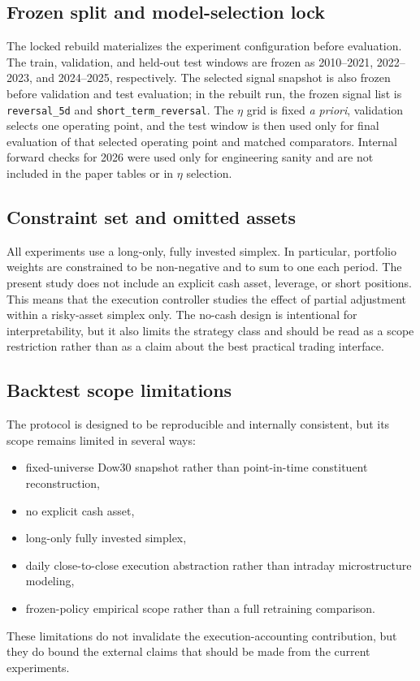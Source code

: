 \documentclass[10pt,twocolumn]{article}
\begin{document}
\subsection{Frozen split and model-selection lock}
The locked rebuild materializes the experiment configuration before evaluation. The train, validation, and held-out test windows are frozen as 2010--2021, 2022--2023, and 2024--2025, respectively. The selected signal snapshot is also frozen before validation and test evaluation; in the rebuilt run, the frozen signal list is \texttt{reversal\_5d} and \texttt{short\_term\_reversal}. The $\eta$ grid is fixed \emph{a priori}, validation selects one operating point, and the test window is then used only for final evaluation of that selected operating point and matched comparators. Internal forward checks for 2026 were used only for engineering sanity and are not included in the paper tables or in $\eta$ selection.

\subsection{Constraint set and omitted assets}
All experiments use a long-only, fully invested simplex. In particular, portfolio weights are constrained to be non-negative and to sum to one each period. The present study does not include an explicit cash asset, leverage, or short positions. This means that the execution controller studies the effect of partial adjustment within a risky-asset simplex only. The no-cash design is intentional for interpretability, but it also limits the strategy class and should be read as a scope restriction rather than as a claim about the best practical trading interface.

\subsection{Backtest scope limitations}
The protocol is designed to be reproducible and internally consistent, but its scope remains limited in several ways:
\begin{itemize}[leftmargin=*,itemsep=1pt]
\item fixed-universe Dow30 snapshot rather than point-in-time constituent reconstruction,
\item no explicit cash asset,
\item long-only fully invested simplex,
\item daily close-to-close execution abstraction rather than intraday microstructure modeling,
\item frozen-policy empirical scope rather than a full retraining comparison.
\end{itemize}
These limitations do not invalidate the execution-accounting contribution, but they do bound the external claims that should be made from the current experiments.
\end{document}
